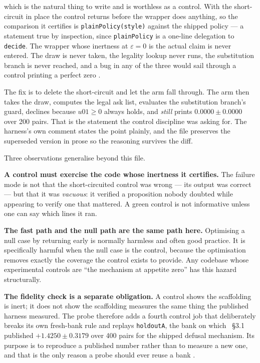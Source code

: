 \documentclass[11pt]{article}
\newcommand{\code}[1]{\texttt{#1}}
\begin{document}
\noindent
which is the natural thing to write and is worthless as a control. With the short-circuit in place
the control returns before the wrapper does anything, so the comparison it certifies is
\code{plainPolicy(style)} against the shipped policy --- a statement true by inspection, since
\code{plainPolicy} is a one-line delegation to \code{decide}. The wrapper whose inertness at
$\varepsilon = 0$ is the actual claim is never entered. The draw is never taken, the legality lookup
never runs, the substitution branch is never reached, and a bug in any of the three would sail
through a control printing a perfect zero \cite{probefloor}.

The fix is to delete the short-circuit and let the arm fall through. The arm then takes the draw,
computes the legal ask list, evaluates the substitution branch's guard, declines because
$u01 \geq 0$ always holds, and \emph{still} prints $0.0000 \pm 0.0000$ over 200 pairs. That is the
statement the control discipline was asking for. The harness's own comment states the point
plainly, and the file preserves the superseded version in prose so the reasoning survives the diff.

Three observations generalise beyond this file.

\textbf{A control must exercise the code whose inertness it certifies.} The failure mode is not that
the short-circuited control was wrong --- its output was correct --- but that it was
\emph{vacuous}: it verified a proposition nobody doubted while appearing to verify one that mattered.
A green control is not informative unless one can say which lines it ran.

\textbf{The fast path and the null path are the same path here.} Optimising a null case by returning
early is normally harmless and often good practice. It is specifically harmful when the null case is
the control, because the optimisation removes exactly the coverage the control exists to provide.
Any codebase whose experimental controls are ``the mechanism at appetite zero'' has this hazard
structurally.

\textbf{The fidelity check is a separate obligation.} A control shows the scaffolding is inert; it
does not show the scaffolding measures the same thing the published harness measured. The probe
therefore adds a fourth control job that deliberately breaks its own fresh-bank rule and replays
\code{holdoutA}, the bank on which \cite{concession}~\S3.1 published
$+1.4250 \pm 0.3179$ over 400 pairs for the shipped defusal mechanism. Its purpose is to reproduce a
published number rather than to measure a new one, and that is the only reason a probe should ever
reuse a bank \cite{probefloor}.
\end{document}

